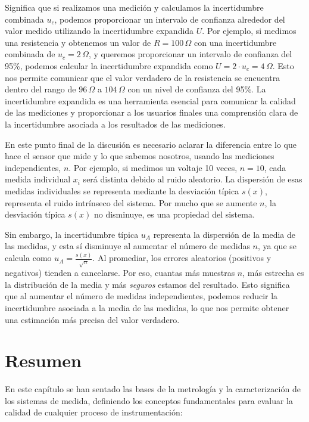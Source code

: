 Significa que si realizamos una medición y calculamos la incertidumbre combinada $u_c$, podemos proporcionar un intervalo de confianza alrededor del valor medido utilizando la incertidumbre expandida $U$. Por ejemplo, si medimos una resistencia y obtenemos un valor de $R = 100 \, \Omega$ con una incertidumbre combinada de $u_c = 2 \, \Omega$, y queremos proporcionar un intervalo de confianza del 95\%, podemos calcular la incertidumbre expandida como $U = 2 \cdot u_c = 4 \, \Omega$. Esto nos permite comunicar que el valor verdadero de la resistencia se encuentra dentro del rango de $96 \, \Omega$ a $104 \, \Omega$ con un nivel de confianza del 95\%. La incertidumbre expandida es una herramienta esencial para comunicar la calidad de las mediciones y proporcionar a los usuarios finales una comprensión clara de la incertidumbre asociada a los resultados de las mediciones.

En este punto final de la discusión es necesario aclarar la diferencia entre lo que hace el sensor que mide y lo que sabemos nosotros, usando las mediciones independientes, $n$. Por ejemplo, si medimos un voltaje 10 veces, $n=10$, cada medida individual $x_i$ será distinta  debido al ruido aleatorio. La dispersión de esas medidas individuales se representa mediante la desviación típica $s(x)$, representa el ruido intrínseco del sistema. Por mucho que se aumente $n$, la desviación típica $s(x)$ no disminuye, es una propiedad del sistema. 

Sin embargo, la incertidumbre típica $u_A$ representa la dispersión de la media de las medidas, y esta sí disminuye al aumentar el número de medidas $n$, ya que se calcula como $u_A = \frac{s(x)}{\sqrt{n}}$. Al promediar, los errores aleatorios (positivos y negativos) tienden a cancelarse. Por eso, cuantas más muestras $n$, más estrecha es la distribución de la media y más \emph{seguros} estamos del resultado. Esto significa que al aumentar el número de medidas independientes, podemos reducir la incertidumbre asociada a la media de las medidas, lo que nos permite obtener una estimación más precisa del valor verdadero. 


\section{Resumen}\label{sec:resumen_metrologia}

En este capítulo se han sentado las bases de la metrología y la caracterización de los sistemas de medida, definiendo los conceptos fundamentales para evaluar la calidad de cualquier proceso de instrumentación:

